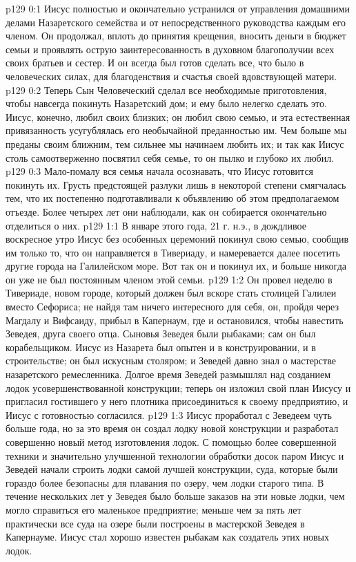 \author{Комиссия срединников}
\vs p129 0:1 Иисус полностью и окончательно устранился от управления домашними делами Назаретского семейства и от непосредственного руководства каждым его членом. Он продолжал, вплоть до принятия крещения, вносить деньги в бюджет семьи и проявлять острую заинтересованность в духовном благополучии всех своих братьев и сестер. И он всегда был готов сделать все, что было в человеческих силах, для благоденствия и счастья своей вдовствующей матери.
\vs p129 0:2 Теперь Сын Человеческий сделал все необходимые приготовления, чтобы навсегда покинуть Назаретский дом; и ему было нелегко сделать это. Иисус, конечно, любил своих близких; он любил свою семью, и эта естественная привязанность усугублялась его необычайной преданностью им. Чем больше мы преданы своим ближним, тем сильнее мы начинаем любить их; и так как Иисус столь самоотверженно посвятил себя семье, то он пылко и глубоко их любил.
\vs p129 0:3 Мало\hyp{}помалу вся семья начала осознавать, что Иисус готовится покинуть их. Грусть предстоящей разлуки лишь в некоторой степени смягчалась тем, что их постепенно подготавливали к объявлению об этом предполагаемом отъезде. Более четырех лет они наблюдали, как он собирается окончательно отделиться о них.
\vs p129 1:1 В январе этого года, 21 г. н.э., в дождливое воскресное утро Иисус без особенных церемоний покинул свою семью, сообщив им только то, что он направляется в Тивериаду, и намеревается далее посетить другие города на Галилейском море. Вот так он и покинул их, и больше никогда он уже не был постоянным членом этой семьи.
\vs p129 1:2 Он провел неделю в Тивериаде, новом городе, который должен был вскоре стать столицей Галилеи вместо Сефориса; не найдя там ничего интересного для себя, он, пройдя через Магдалу и Вифсаиду, прибыл в Капернаум, где и остановился, чтобы навестить Зеведея, друга своего отца. Сыновья Зеведея были рыбаками; сам он был корабельщиком. Иисус из Назарета был опытен и в конструировании, и в строительстве; он был искусным столяром; и Зеведей давно знал о мастерстве назаретского ремесленника. Долгое время Зеведей размышлял над созданием лодок усовершенствованной конструкции; теперь он изложил свой план Иисусу и пригласил гостившего у него плотника присоединиться к своему предприятию, и Иисус с готовностью согласился.
\vs p129 1:3 Иисус проработал с Зеведеем чуть больше года, но за это время он создал лодку новой конструкции и разработал совершенно новый метод изготовления лодок. С помощью более совершенной техники и значительно улучшенной технологии обработки досок паром Иисус и Зеведей начали строить лодки самой лучшей конструкции, суда, которые были гораздо более безопасны для плавания по озеру, чем лодки старого типа. В течение нескольких лет у Зеведея было больше заказов на эти новые лодки, чем могло справиться его маленькое предприятие; меньше чем за пять лет практически все суда на озере были построены в мастерской Зеведея в Капернауме. Иисус стал хорошо известен рыбакам как создатель этих новых лодок.
